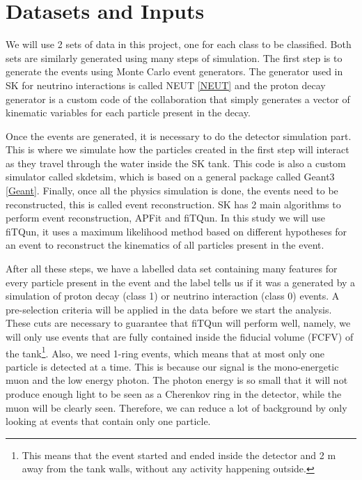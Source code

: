 
\section{Datasets and Inputs} \label{Data}

We will use 2 sets of data in this project, one for each class to be classified. Both sets are similarly generated using many steps of simulation. The first step is to generate the events using Monte Carlo event generators. The generator used in SK for neutrino interactions is called NEUT \ref{NEUT} and the proton decay generator is a custom code of the collaboration that simply generates a vector of kinematic variables for each particle present in the decay.

Once the events are generated, it is necessary to do the detector simulation part. This is where we simulate how the particles created in the first step will interact as they travel through the water inside the SK tank. This code is also a custom simulator called skdetsim, which is based on a general package called Geant3 \ref{Geant}. Finally, once all the physics simulation is done, the events need to be reconstructed, this is called event reconstruction. SK has 2 main algorithms to perform event reconstruction, APFit and fiTQun. In this study we will use fiTQun, it uses a maximum likelihood  method based on different hypotheses for an event to reconstruct the kinematics of all particles present in the event.

After all these steps, we have a labelled data set containing many features for every particle present in the event and the label tells us if it was a generated by a simulation of proton decay (class 1) or neutrino interaction (class 0) events. A pre-selection criteria will be applied in the data before we start the analysis. These cuts are necessary to guarantee that fiTQun will perform well, namely, we will only use events that are fully contained inside the fiducial volume (FCFV) of the tank\footnote{This means that the event started and ended inside the detector and 2 m away from the tank walls, without any activity happening outside.}. Also, we need 1-ring events, which means that at most only one particle is detected at a time. This is because our signal is the mono-energetic muon and the low energy photon. The photon energy is so small that it will not produce enough light to be seen as a Cherenkov ring in the detector, while the muon will be clearly seen. Therefore, we can reduce a lot of background by only looking at events that contain only one particle.

